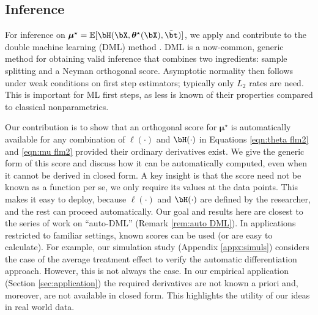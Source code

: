 \documentclass[12pt]{article}
\numberwithin{equation}{section}
\theoremstyle{definition}
\newcommand{\E}{\mathbb{E}}
\newcommand{\bmu}{\boldsymbol{\mu}}
\newcommand{\btheta}{\boldsymbol{\theta}}
\newcommand{\bmtrue}{\bmu^\star}
\newcommand{\bttrue}{\btheta^\star}
\newcommand{\btstar}{\tilde{\bt}}
\begin{document}
\subsection{Inference}
	\label{sec:inference}



For inference on $\bmtrue = \E[\bH(\bX, \bttrue(\bX), \btstar)]$, we apply and contribute to the double machine learning (DML) method \cite{Chernozhukov-etal2018_EJ}. DML is a now-common, generic method for obtaining valid inference that combines two ingredients: sample splitting and a Neyman orthogonal score. Asymptotic normality then follows under weak conditions on first step estimators; typically only $L_2$ rates are need. This is important for ML first steps, as less is known of their properties compared to classical nonparametrics. 

Our contribution is to show that an orthogonal score for $\bmtrue$ is automatically available for any combination of $\ell(\cdot)$ and $\bH(\cdot)$ in Equations \eqref{eqn:theta flm2} and \eqref{eqn:mu flm2} provided their ordinary derivatives exist. We give the generic form of this score and discuss how it can be automatically computed, even when it cannot be derived in closed form. A key insight is that the score need not be known as a function per se, we only require its values at the data points. This makes it easy to deploy, because $\ell(\cdot)$ and $\bH(\cdot)$ are defined by the researcher, and the rest can proceed automatically. Our goal and results here are closest to the series of work on ``auto-DML'' (Remark \ref{rem:auto DML}). In applications restricted to familiar settings, known scores can be used (or are easy to calculate). For example, our simulation study (Appendix \ref{appx:simuls}) considers the case of the average treatment effect to verify the automatic differentiation approach. However, this is not always the case. In our empirical application (Section \ref{sec:application}) the required derivatives are not known a priori and, moreover, are not available in closed form. This highlights the utility of our ideas in real world data. 
\end{document}
